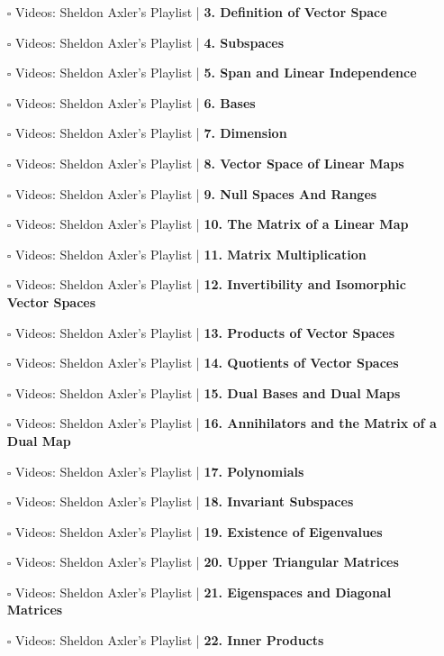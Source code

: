 \documentclass[a4, landscape, 12pt]{article}
\newcommand{\checkbox}{$\square$}%
\begin{document}
\begin{itemize}
{}
\item [\checkbox] Videos: Sheldon Axler’s Playlist  | \textbf{3. Definition of Vector Space
}
\item [\checkbox] Videos: Sheldon Axler’s Playlist  | \textbf{4. Subspaces
}
\item [\checkbox] Videos: Sheldon Axler’s Playlist  | \textbf{5. Span and Linear Independence
}
\item [\checkbox] Videos: Sheldon Axler’s Playlist  | \textbf{6. Bases
}
\item [\checkbox] Videos: Sheldon Axler’s Playlist  | \textbf{7. Dimension
}
\item [\checkbox] Videos: Sheldon Axler’s Playlist  | \textbf{8. Vector Space of Linear Maps
}
\item [\checkbox] Videos: Sheldon Axler’s Playlist  | \textbf{9. Null Spaces And Ranges
}
\item [\checkbox] Videos: Sheldon Axler’s Playlist  | \textbf{10. The Matrix of a Linear Map
}
\item [\checkbox] Videos: Sheldon Axler’s Playlist  | \textbf{11. Matrix Multiplication
}
\item [\checkbox] Videos: Sheldon Axler’s Playlist  | \textbf{12. Invertibility and Isomorphic Vector Spaces
}
\item [\checkbox] Videos: Sheldon Axler’s Playlist  | \textbf{13. Products of Vector Spaces
}
\item [\checkbox] Videos: Sheldon Axler’s Playlist  | \textbf{14. Quotients of Vector Spaces
}
\item [\checkbox] Videos: Sheldon Axler’s Playlist  | \textbf{15. Dual Bases and Dual Maps
}
\item [\checkbox] Videos: Sheldon Axler’s Playlist  | \textbf{16. Annihilators and the Matrix of a Dual Map
}
\item [\checkbox] Videos: Sheldon Axler’s Playlist  | \textbf{17. Polynomials
}
\item [\checkbox] Videos: Sheldon Axler’s Playlist  | \textbf{18. Invariant Subspaces
}
\item [\checkbox] Videos: Sheldon Axler’s Playlist  | \textbf{19. Existence of Eigenvalues
}
\item [\checkbox] Videos: Sheldon Axler’s Playlist  | \textbf{20. Upper Triangular Matrices
}
\item [\checkbox] Videos: Sheldon Axler’s Playlist  | \textbf{21. Eigenspaces and Diagonal Matrices
}
\item [\checkbox] Videos: Sheldon Axler’s Playlist  | \textbf{22. Inner Products
}
\end{itemize}
\end{document}
